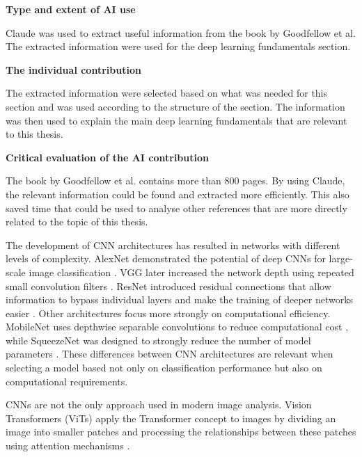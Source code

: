 \begin{tcolorbox}[
    colback=gray!15,
    colframe=gray!50,
    boxrule=0.5pt
]

\textbf{Type and extent of AI use}

Claude was used to extract useful information from the book by Goodfellow et al. The extracted information were used for the deep learning fundamentals section.

\vspace{0.4cm}

\textbf{The individual contribution}

The extracted information were selected based on what was needed for this section and was used according to the structure of the section. The information was then used to explain the main deep learning fundamentals that are relevant to this thesis.

\vspace{0.4cm}

\textbf{Critical evaluation of the AI contribution}

The book by Goodfellow et al. contains more than 800 pages. By using Claude, the relevant information could be found and extracted more efficiently. This also saved time that could be used to analyse other references that are more directly related to the topic of this thesis.

\end{tcolorbox}

The development of CNN architectures has resulted in networks with different levels of complexity. AlexNet demonstrated the potential of deep CNNs for large-scale image classification \cite{Krizhevsky2012}. VGG later increased the network depth using repeated small convolution filters \cite{Simonyan2015}. ResNet introduced residual connections that allow information to bypass individual layers and make the training of deeper networks easier \cite{He2016}. Other architectures focus more strongly on computational efficiency. MobileNet uses depthwise separable convolutions to reduce computational cost \cite{Howard2017}, while SqueezeNet was designed to strongly reduce the number of model parameters \cite{Iandola2016}. These differences between CNN architectures are relevant when selecting a model based not only on classification performance but also on computational requirements.

CNNs are not the only approach used in modern image analysis. Vision Transformers (ViTs) apply the Transformer concept to images by dividing an image into smaller patches and processing the relationships between these patches using attention mechanisms \cite{Dosovitskiy2021}. 

